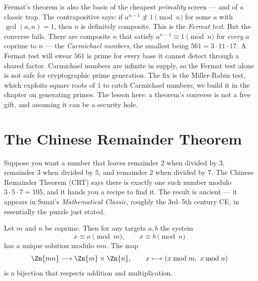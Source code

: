 \begin{attackbox}
Fermat's theorem is also the basis of the cheapest \emph{primality} screen --- and of a classic
trap. The contrapositive says: if $a^{n-1} \not\equiv 1 \pmod n$ for some $a$ with $\gcd(a,n)=1$,
then $n$ is definitely composite. This is the \emph{Fermat test}. But the converse fails. There are
composite $n$ that satisfy $a^{n-1} \equiv 1 \pmod n$ for \emph{every} $a$ coprime to $n$ --- the
\emph{Carmichael numbers}, the smallest being $561 = 3 \cdot 11 \cdot 17$. A Fermat test will swear
$561$ is prime for every base it cannot detect through a shared factor. Carmichael numbers are
infinite in supply, so the Fermat test alone is not safe for cryptographic prime generation. The
fix is the Miller-Rabin test, which exploits square roots of $1$ to catch Carmichael numbers; we
build it in the chapter on generating primes. The lesson here: a theorem's converse is not a free
gift, and assuming it can be a security hole.
\end{attackbox}

\section{The Chinese Remainder Theorem}
\label{ch04:crt}

Suppose you want a number that leaves remainder $2$ when divided by $3$, remainder $3$ when divided
by $5$, and remainder $2$ when divided by $7$. The Chinese Remainder Theorem (CRT) says there is
exactly one such number modulo $3 \cdot 5 \cdot 7 = 105$, and it hands you a recipe to find it. The
result is ancient --- it appears in Sunzi's \emph{Mathematical Classic}, roughly the 3rd--5th
century CE, in essentially the puzzle just stated.

\begin{theorem}
\label{ch04:thm-crt}
Let $m$ and $n$ be coprime. Then for any targets $a, b$ the system
\[
  x \equiv a \pmod m, \qquad x \equiv b \pmod n
\]
has a unique solution modulo $mn$. The map
\[
  \Zn{mn} \longrightarrow \Zn{m} \times \Zn{n}, \qquad
  x \longmapsto (x \bmod m,\ x \bmod n)
\]
is a bijection that respects addition and multiplication.
\end{theorem}

